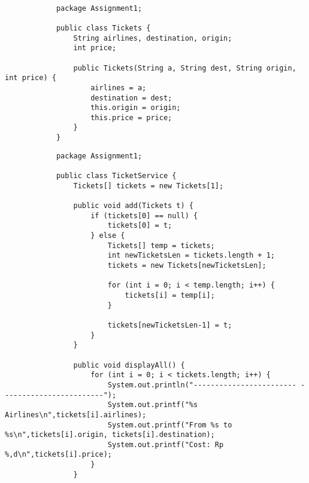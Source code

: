 \documentclass[12pt,titlepage]{article}
\begin{document}
\begin{enumerate}
\begin{enumerate}[label=\arabic*.]
        \mbox{}\\
        \begin{verbatim}
            package Assignment1;

            public class Tickets {
                String airlines, destination, origin;
                int price;

                public Tickets(String a, String dest, String origin, int price) {
                    airlines = a;
                    destination = dest;
                    this.origin = origin;
                    this.price = price;
                }
            }
        \end{verbatim}
        \begin{verbatim}
            package Assignment1;

            public class TicketService {
                Tickets[] tickets = new Tickets[1];

                public void add(Tickets t) {
                    if (tickets[0] == null) {
                        tickets[0] = t;
                    } else {
                        Tickets[] temp = tickets;
                        int newTicketsLen = tickets.length + 1;
                        tickets = new Tickets[newTicketsLen];

                        for (int i = 0; i < temp.length; i++) {
                            tickets[i] = temp[i];
                        }

                        tickets[newTicketsLen-1] = t;
                    }
                }

                public void displayAll() {
                    for (int i = 0; i < tickets.length; i++) {
                        System.out.println("------------------------ ------------------------");
                        System.out.printf("%s Airlines\n",tickets[i].airlines);
                        System.out.printf("From %s to %s\n",tickets[i].origin, tickets[i].destination);
                        System.out.printf("Cost: Rp %,d\n",tickets[i].price);
                    }
                }


\end{verbatim}
\end{enumerate}
\end{enumerate}
\end{document}
